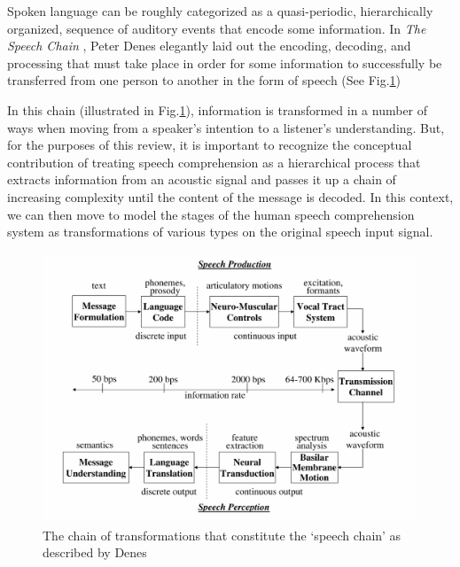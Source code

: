 \documentclass[titlepage]{article}
\begin{document}
    Spoken language can be roughly categorized as a quasi-periodic, 
    hierarchically organized, sequence of auditory events that encode some 
    information. In \textit{The Speech Chain} \cite{Denes1993}, Peter Denes 
    elegantly laid out the encoding, decoding, and processing that must take 
    place in order for some information to successfully be transferred from one
    person to another in the form of speech (See Fig.\ref{speechChain})

    In this chain (illustrated in Fig.\ref{speechChain}), information
    is transformed in a number of ways when moving from a speaker's intention to a listener's
    understanding. But, for the purposes of this review, it is important to recognize the
    conceptual contribution of treating speech comprehension as a hierarchical process
    that extracts information from an acoustic signal and passes it up a chain of increasing
    complexity until the content of the message is decoded. In this context, we can then move
    to model the stages of the human speech comprehension system as transformations of
    various types on the original speech input signal.

    \begin{figure}
      \centering
      \includegraphics[scale=0.3]{speechChain}
      \caption{The chain of transformations that constitute the `speech chain' as
      described by Denes \cite{Denes1993,Rabiner2007}}
      \label{speechChain}
    \end{figure}
\end{document}
